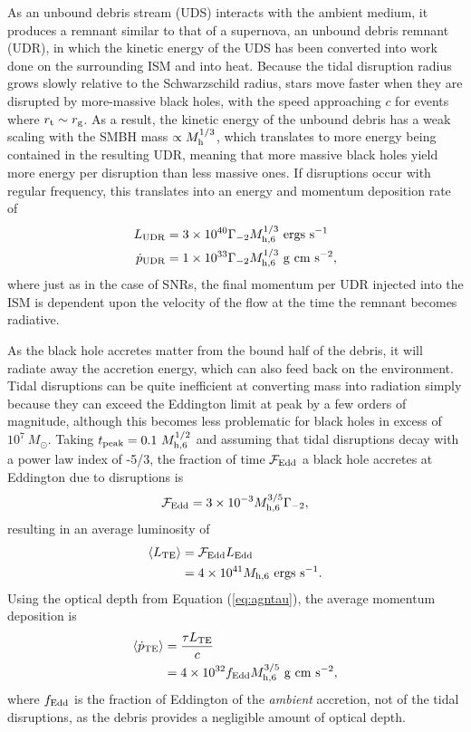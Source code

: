 \documentclass[preprint2]{aastex}
\newcommand{\mhsix}{M_{\rm h,6}\xspace}
\begin{document}
As an unbound debris stream (UDS) interacts with the ambient medium, it produces a remnant similar to that of a supernova, an unbound debris remnant (UDR), in which the kinetic energy of the UDS has been converted into work done on the surrounding ISM and into heat. Because the tidal disruption radius grows slowly relative to the Schwarzschild radius, stars move faster when they are disrupted by more-massive black holes, with the speed approaching $c$ for events where $r_{\rm t} \sim r_{\rm g}$. As a result, the kinetic energy of the unbound debris has a weak scaling with the SMBH mass $\propto M_{\rm h}^{1/3}$, which translates to more energy being contained in the resulting UDR, meaning that more massive black holes yield more energy per disruption than less massive ones. If disruptions occur with regular frequency, this translates into an energy and momentum deposition rate of
\begin{align}
L_{\rm UDR}  &= 3 \times 10^{40} \Gamma_{-2} \mhsix^{1/3}~{\rm ergs~s}^{-1}\\
\dot{p}_{\rm UDR}  &= 1 \times 10^{33} \Gamma_{-2} \mhsix^{1/3}~{\rm g~cm~s}^{-2}\label{eq:pudr},
\end{align}
where just as in the case of SNRs, the final momentum per UDR injected into the ISM is dependent upon the velocity of the flow at the time the remnant becomes radiative.

As the black hole accretes matter from the bound half of the debris, it will radiate away the accretion energy, which can also feed back on the environment. Tidal disruptions can be quite inefficient at converting mass into radiation simply because they can exceed the Eddington limit at peak by a few orders of magnitude, although this becomes less problematic for black holes in excess of $10^{7}~M_{\odot}$. Taking $t_{\rm peak} = 0.1~M_{\rm h,6}^{1/2}$ \citep{Guillochon:2013a} and assuming that tidal disruptions decay with a power law index of -5/3, the fraction of time ${\cal F}_{\rm Edd}$ a black hole accretes at Eddington due to disruptions is
\begin{align}
{\cal F}_{\rm Edd} = 3 \times 10^{-3} M_{\rm h,6}^{3/5} \Gamma_{-2},
\end{align}
resulting in an average luminosity of
\begin{align}
\langle L_{\rm TE} \rangle &= {\cal F}_{\rm Edd} L_{\rm Edd}\nonumber\\
&= 4 \times 10^{41} M_{\rm h,6}~{\rm ergs~s}^{-1}.
\end{align}
Using the optical depth from Equation (\ref{eq:agntau}), the average momentum deposition is
\begin{align}
\langle \dot{p}_{\rm TE} \rangle &= \frac{\tau L_{\rm TE}}{c}\nonumber\\
&= 4 \times 10^{32} f_{\rm Edd} M_{\rm h, 6}^{3/5}~{\rm g~cm~s}^{-2},
\end{align}
where $f_{\rm Edd}$ is the fraction of Eddington of the {\it ambient} accretion, not of the tidal disruptions, as the debris provides a negligible amount of optical depth.
\end{document}
